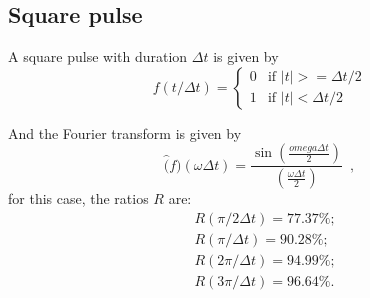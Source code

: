 \documentclass[12pt,letterpaper]{article}
\begin{document}
{\subsection{Square pulse}
A square pulse with duration \(\Delta t\) is given  by
\begin{equation}\label{eq:square_time}
f(t/\Delta t) =
\begin{cases}
    0 &\mbox{if } |t| >= \Delta t/2 \\
    1 & \mbox{if } |t| < \Delta t/2
\end{cases} 
\end{equation}

And the Fourier transform is given by
\begin{equation}\label{eq:square_freq}
\hat(f)(\omega \Delta t) = \frac{\sin\left(\frac{omega \Delta t}{2}\right)}{\left(\frac{\omega \Delta t}{2}\right)} \enspace ,
\end{equation}
for this case, the ratios \(R\) are:
\begin{align*}
    &R(\pi/2\Delta t) = 77.37\%;\\
    &R(\pi/\Delta t) = 90.28\%;\\
    &R(2\pi/\Delta t) = 94.99\%;\\
    &R(3\pi/\Delta t) = 96.64\%.
\end{align*}

}
\end{document}
